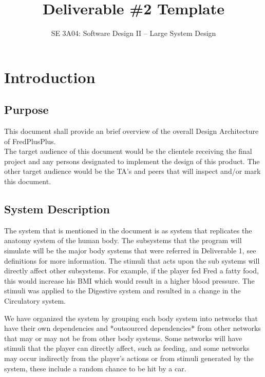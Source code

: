 \documentclass[]{article}
\title{Deliverable \#2 Template}
\author{SE 3A04: Software Design II -- Large System Design}
\date{}
\begin{document}
\maketitle	

\section{Introduction}
\label{sec:introduction}


\subsection{Purpose}
\label{sub:purpose}

This document shall provide an brief overview of the overall Design Architecture
of FredPlusPlus.\\
The target audience of this document would be the clientele receiving the final project and any persons designated to implement the design of this product. The other target audience would be the TA's and peers that will inspect and/or mark this document.

\subsection{System Description}
\label{sub:system_description}
	The system that is mentioned in the document is as system that replicates the anatomy system of the human body. The subsystems that the program will simulate will be the major body systems that were referred in Deliverable 1, see definitions for more information. The stimuli that acts upon the sub systems will directly affect other subsystems. For example, if the player fed Fred a fatty food, this would increase his BMI which would result in a higher blood pressure. The stimuli was applied to the Digestive system and resulted in a change in the Circulatory system.
	
	We have organized the system by grouping each body system into networks that have their own dependencies and *outsourced dependencies* from other networks that may or may not be from other body systems. Some networks will have stimuli that the player can directly affect, such as feeding, and some networks may occur indirectly from the player's actions or from stimuli generated by the system, these include a random chance to be hit by a car.
\end{document}
